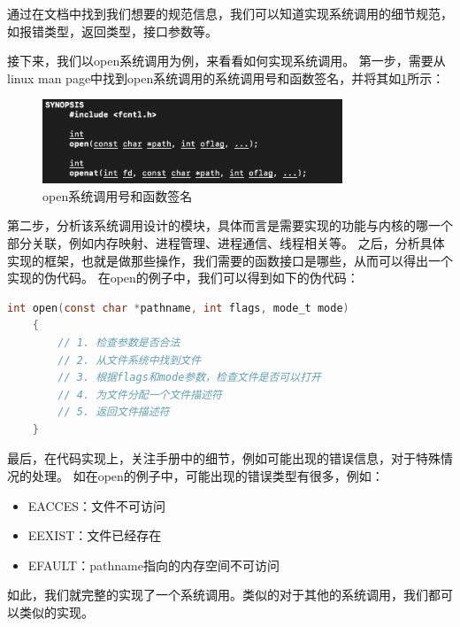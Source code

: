 通过在文档中找到我们想要的规范信息，我们可以知道实现系统调用的细节规范，如报错类型，返回类型，接口参数等。

接下来，我们以open系统调用为例，来看看如何实现系统调用。
第一步，需要从linux man page中找到open系统调用的系统调用号和函数签名，并将其如\ref{fig:opensyscall1}所示：
\begin{figure}[H]
  \centering
  \includegraphics[width=0.8\textwidth]{figures/09-03-open系统调用签名.png}
  \caption{open系统调用号和函数签名}
  \label{fig:opensyscall1}
\end{figure}

第二步，分析该系统调用设计的模块，具体而言是需要实现的功能与内核的哪一个部分关联，例如内存映射、进程管理、进程通信、线程相关等。
之后，分析具体实现的框架，也就是做那些操作，我们需要的函数接口是哪些，从而可以得出一个实现的伪代码。
在open的例子中，我们可以得到如下的伪代码：
\begin{lstlisting}[language=c]
    int open(const char *pathname, int flags, mode_t mode)
    {
        // 1. 检查参数是否合法
        // 2. 从文件系统中找到文件
        // 3. 根据flags和mode参数，检查文件是否可以打开
        // 4. 为文件分配一个文件描述符
        // 5. 返回文件描述符
    }
\end{lstlisting}

最后，在代码实现上，关注手册中的细节，例如可能出现的错误信息，对于特殊情况的处理。
如在open的例子中，可能出现的错误类型有很多，例如：
\begin{itemize}
    \item EACCES：文件不可访问
    \item EEXIST：文件已经存在
    \item EFAULT：pathname指向的内存空间不可访问
\end{itemize}

如此，我们就完整的实现了一个系统调用。类似的对于其他的系统调用，我们都可以类似的实现。